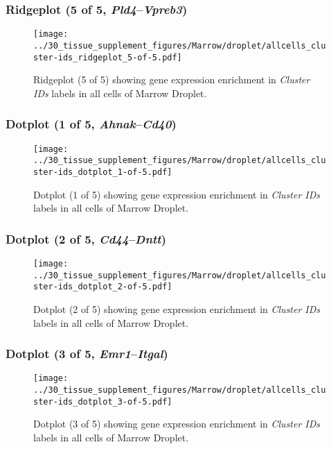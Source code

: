 \clearpage

\subsubsection{Ridgeplot (5 of 5, \emph{Pld4}--\emph{Vpreb3})}
\begin{figure}[h]
\centering
\texttt{[image: ../30\_tissue\_supplement\_figures/Marrow/droplet/allcells\_cluster-ids\_ridgeplot\_5-of-5.pdf]}

\caption{ Ridgeplot (5 of 5)  showing gene expression enrichment in \emph{Cluster IDs} labels in all cells of Marrow Droplet. }
\end{figure}


\clearpage

\subsubsection{Dotplot (1 of 5, \emph{Ahnak}--\emph{Cd40})}
\begin{figure}[h]
\centering
\texttt{[image: ../30\_tissue\_supplement\_figures/Marrow/droplet/allcells\_cluster-ids\_dotplot\_1-of-5.pdf]}

\caption{ Dotplot (1 of 5)  showing gene expression enrichment in \emph{Cluster IDs} labels in all cells of Marrow Droplet. }
\end{figure}


\clearpage

\subsubsection{Dotplot (2 of 5, \emph{Cd44}--\emph{Dntt})}
\begin{figure}[h]
\centering
\texttt{[image: ../30\_tissue\_supplement\_figures/Marrow/droplet/allcells\_cluster-ids\_dotplot\_2-of-5.pdf]}

\caption{ Dotplot (2 of 5)  showing gene expression enrichment in \emph{Cluster IDs} labels in all cells of Marrow Droplet. }
\end{figure}


\clearpage

\subsubsection{Dotplot (3 of 5, \emph{Emr1}--\emph{Itgal})}
\begin{figure}[h]
\centering
\texttt{[image: ../30\_tissue\_supplement\_figures/Marrow/droplet/allcells\_cluster-ids\_dotplot\_3-of-5.pdf]}

\caption{ Dotplot (3 of 5)  showing gene expression enrichment in \emph{Cluster IDs} labels in all cells of Marrow Droplet. }
\end{figure}


